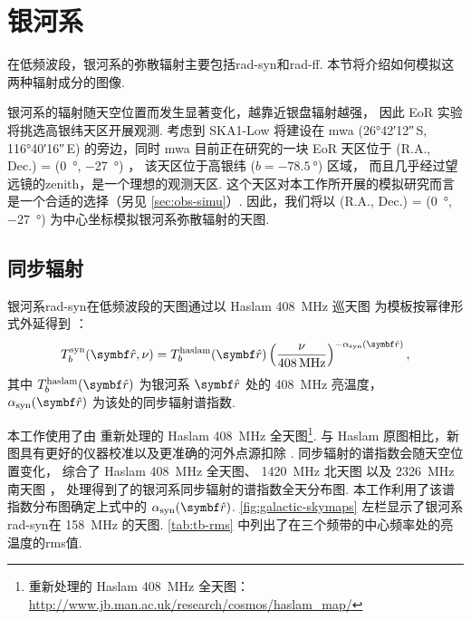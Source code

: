 \section{银河系}
\label{sec:simu-galactic}

在低频波段，银河系的弥散辐射主要包括\ac{rad-syn}和\ac{rad-ff}.
本节将介绍如何模拟这两种辐射成分的图像.

银河系的辐射随天空位置而发生显著变化，越靠近银盘辐射越强，
因此 EoR 实验将挑选高银纬天区开展观测.
考虑到 SKA1-Low 将建设在 \ac{mwa} (\ang{26;42;12}\,S, \ang{116;40;16}\,E)
的旁边，同时 \ac{mwa} 目前正在研究的一块 EoR 天区位于
(R.A., Dec.\@) = (\SI{0}{\degree}, \SI{-27}{\degree}) \cite{beardsley2016}，
该天区位于高银纬 ($b = \SI{-78.5}{\degree}$) 区域，
而且几乎经过望远镜的\ac{zenith}，是一个理想的观测天区.
这个天区对本工作所开展的模拟研究而言是一个合适的选择（另见 \autoref{sec:obs-simu}）.
因此，我们将以 (R.A., Dec.\@) = (\SI{0}{\degree}, \SI{-27}{\degree})
为中心坐标模拟银河系弥散辐射的天图.

\subsection{同步辐射}

银河系\ac{rad-syn}在低频波段的天图通过以
Haslam \SI{408}{\MHz} 巡天图\cite{haslam1982}
为模板按幂律形式外延得到 \cite{wang2010,bonaldi2015}：
\begin{equation}
  T_b^{\R{syn}}(\B{\hat{r}}, \nu)
    = T_b^{\R{haslam}}(\B{\hat{r}}) \left( \frac{\nu}{\SI{408}{\MHz}}
      \right)^{-\alpha_{\R{syn}}(\B{\hat{r}})} ,
\end{equation}
其中 $T_b^{\R{haslam}}(\B{\hat{r}})$ 为银河系 $\B{\hat{r}}$ 处的
\SI{408}{\MHz} 亮温度，
$\alpha_{\R{syn}}(\B{\hat{r}})$ 为该处的同步辐射谱指数.

本工作使用了由  重新处理的 Haslam \SI{408}{\MHz}
全天图\footnote{%
  重新处理的 Haslam \SI{408}{\MHz} 全天图：
  \url{http://www.jb.man.ac.uk/research/cosmos/haslam_map/}}.
与 Haslam 原图相比，新图具有更好的仪器校准以及更准确的河外点源扣除 \cite{remazeilles2015}.
同步辐射的谱指数会随天空位置变化，
 综合了 Haslam \SI{408}{\MHz} 全天图、
\SI{1420}{\MHz} 北天图 \cite{reich1986}
以及 \SI{2326}{\MHz} 南天图 \cite{jonas1998}，
处理得到了的银河系同步辐射的谱指数全天分布图.
本工作利用了该谱指数分布图确定上式中的 $\alpha_{\R{syn}}(\B{\hat{r}})$.
\autoref{fig:galactic-skymaps} 左栏显示了银河系\ac{rad-syn}在
\SI{158}{\MHz} 的天图.
\autoref{tab:tb-rms} 中列出了在三个频带的中心频率处的亮温度的\ac{rms}值.

